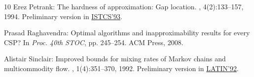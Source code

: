 \begin{thebibliography}{10}
{\sc Erez Petrank}: The hardness of approximation: Gap location.
, 4(2):133--157, 1994.
\newblock Preliminary version in
  \href{http://dx.doi.org/10.1109/ISTCS.1993.253461}{ISTCS'93}.
\newblock [\epfmtdoi{10.1007/BF01202286}]

{\sc Prasad Raghavendra}: Optimal algorithms and inapproximability results for
  every {CSP}?
\newblock In {\em Proc. 40th STOC}, pp. 245--254. ACM Press, 2008.
\newblock [\epfmtdoi{10.1145/1374376.1374414}]

{\sc Alistair Sinclair}: Improved bounds for mixing rates of {M}arkov chains
  and multicommodity flow.
, 1(4):351--370, 1992.
\newblock Preliminary version in
  \href{http://dx.doi.org/10.1007/BFb0023849}{LATIN'92}.
\newblock [\epfmtdoi{10.1017/S0963548300000390}]

\end{thebibliography}
